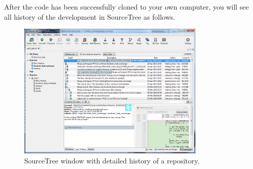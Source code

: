 After the code has been successfully cloned to your own computer, you will see all history of the development in SourceTree as follows. 
\begin{figure}
\begin{center}
\includegraphics[width=0.8\textwidth]{fig/sourcetree_repo}
\end{center}
\caption{SourceTree window with detailed history of a repository.}
\label{fig:sourcetree_repo}
\end{figure}

